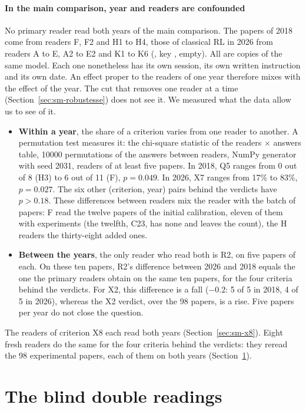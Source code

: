 \paragraph{In the main comparison, year and readers are confounded}\label{sec:sm-annees}
No primary reader read both years of the main comparison. The papers of 2018 come from readers F, F2
and H1 to H4, those of classical RL in 2026 from readers A to E, A2 to E2 and K1 to K6
(, key , empty). All are copies of the
same model. Each one nonetheless has its own session, its own written instruction and its own date. An
effect proper to the readers of one year therefore mixes with the effect of the year. The cut that
removes one reader at a time (Section~\ref{sec:sm-robustesse}) does not see it. We measured what the
data allow us to see of it.
\begin{itemize}
  \item \textbf{Within a year}, the share of a criterion varies from one reader to another. A
  permutation test measures it: the chi-square statistic of the readers $\times$ answers table,
  \num{10000} permutations of the answers between readers, NumPy generator with seed 2031, readers of
  at least five papers. In 2018, Q5 ranges from 0 out of 8 (H3) to 6 out of 11 (F), $p = 0.049$. In
  2026, X7 ranges from 17\% to 83\%, $p = 0.027$. The six other (criterion, year) pairs behind the
  verdicts have $p > 0.18$. These differences between readers mix the reader with the batch of papers: F read the twelve
  papers of the initial calibration, eleven of them with experiments (the twelfth, C23, has none and
  leaves the count), the H readers the thirty-eight added ones.
  \item \textbf{Between the years}, the only reader who read both is R2, on five papers of each. On
  these ten papers, R2's difference between 2026 and 2018 equals the one the primary readers obtain on
  the same ten papers, for the four criteria behind the verdicts. For X2, this difference is a fall
  ($-0.2$: 5 of 5 in 2018, 4 of 5 in 2026), whereas the X2 verdict, over the 98 papers, is a rise. Five papers per year do not close the question.
\end{itemize}
The readers of criterion X8 each read both years (Section~\ref{sec:sm-x8}). Eight fresh readers do
the same for the four criteria behind the verdicts: they reread the 98 experimental papers, each of
them on both years (Section~\ref{sec:sm-doubles}).

\section{The blind double readings}\label{sec:sm-doubles}

